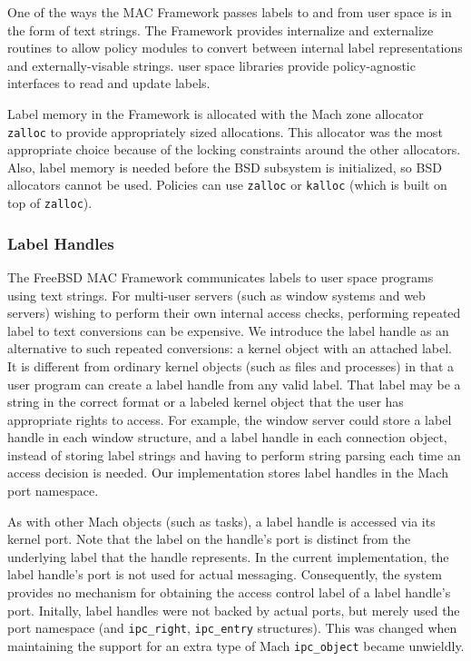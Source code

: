 One of the ways the MAC Framework passes labels to and from user space
is in the form of text strings.  The Framework provides internalize and
externalize routines to allow policy modules to convert between
internal label representations and externally-visable strings.
user space libraries provide policy-agnostic interfaces to read and
update labels.

Label memory in the Framework is allocated with the
Mach zone allocator {\tt zalloc} to provide appropriately sized allocations.
This allocator was the most appropriate
choice because of the locking constraints around the other allocators.
Also, label memory is needed before the BSD subsystem is initialized, so
BSD allocators cannot be used. Policies can use {\tt zalloc} or {\tt kalloc}
(which is built on top of {\tt zalloc}).

\subsubsection{Label Handles}

The FreeBSD MAC Framework communicates labels to user space programs
using text strings. For multi-user servers (such as window systems
and web servers) wishing to perform their own internal access checks,
performing repeated label to text conversions can be expensive. We
introduce the label handle as an alternative to such repeated
conversions: a kernel object with an attached label. It is different
from ordinary kernel objects (such as files and processes) in that
a user program can create a label handle from any valid label.  That
label may be a string in the correct format or a labeled kernel object
that the user has appropriate rights to access.
For example, the window server could store a label handle in each
window structure, and a label handle in each connection object,
instead of storing label strings and having to perform string parsing
each time an access decision is needed.  Our implementation stores
label handles in the Mach port namespace.

As with other Mach objects (such as tasks), a label handle is
accessed via its kernel port.  Note that the label on the handle's
port is distinct from the underlying label that the handle represents.
In the current implementation, the label handle's port is not used
for actual messaging.  Consequently, the system provides no mechanism
for obtaining the access control label of a label handle's port.
Initally, label handles were not backed by actual ports, but merely
used the port namespace (and {\tt ipc\_right}, {\tt ipc\_entry}
structures).  This was changed when maintaining the support for
an extra type of Mach {\tt ipc\_object} became unwieldly.

